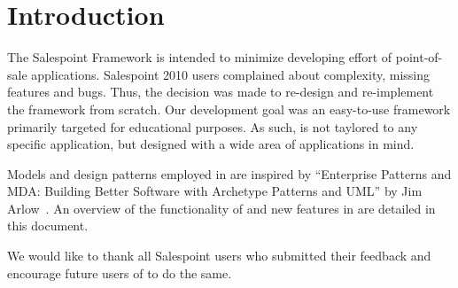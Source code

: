 \chapter{Introduction}
The Salespoint Framework is intended to minimize developing effort of point-of-sale applications.
Salespoint 2010 users complained about complexity, missing features and bugs.
Thus, the decision was made to re-design and re-implement the framework from scratch.
Our development goal was an easy-to-use framework primarily targeted for educational purposes.
As such, \salespoint{} is not taylored to any specific application, but designed with a wide area of applications in mind.

Models and design patterns employed in \salespoint{} are inspired by ``Enterprise Patterns and MDA: Building Better Software with Archetype Patterns and UML'' by Jim Arlow~\cite{MDA}.
An overview of the functionality of and new features in \salespoint{} are detailed in this document.

We would like to thank all Salespoint users who submitted their feedback and encourage future users of \salespoint{} to do the same.
